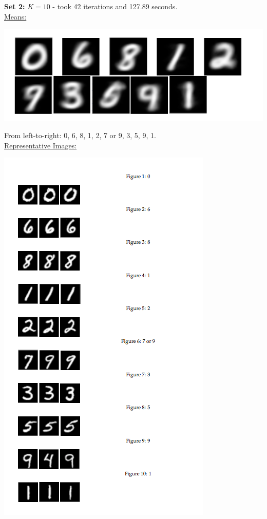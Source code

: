 \documentclass[submit]{harvardml}
\begin{document}
\textbf{Set 2:} $K = 10$ - took 42 iterations and 127.89 seconds. \\
\underline{Means:}\\ 
	\centerline{\includegraphics[scale=0.5]{./lmaa}}
\noindent From left-to-right: 0, 6, 8, 1, 2, 7 or 9, 3, 5, 9, 1.	\\
\underline{Representative Images:}\\
\centerline{\includegraphics[scale=0.6]{./lmao}}
\end{document}
